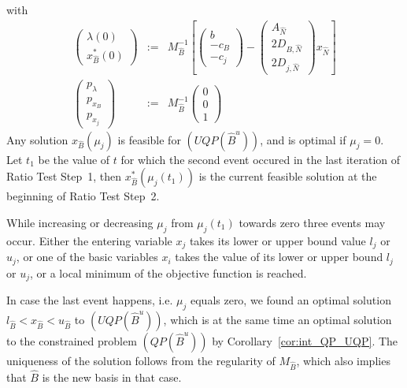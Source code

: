 \documentclass[a4paper]{article}
\begin{document}
with
\begin{eqnarray}
\left(
\begin{array}{c}
\lambda(0) \\
\hline
x_{\hat{B}}^{*}(0)
\end{array}
\right)
&:=&
M_{\hat{B}}^{-1}
\left[
\left(
\begin{array}{c}
b \\
\hline
-c_{B} \\
\hline
-c_{j}
\end{array}
\right)
-
\left(
\begin{array}{c}
A_{\hat{N}} \\
\hline
2D_{B, \hat{N}} \\
\hline
2D_{j, \hat{N}}
\end{array}
\right)
x_{\hat{N}}
\right]
\\
\left(
\begin{array}{c}
p_{\lambda} \\
\hline
p_{x_{B}} \\
\hline
p_{x_{j}}
\end{array}
\right)
&:=&
M_{\hat{B}}^{-1}
\left(
\begin{array}{c}
0 \\
\hline
0 \\
\hline
1
\end{array}
\right)
\end{eqnarray}
Any solution $x_{\hat{B}}(\mu_{j})$ is feasible for $(UQP(\hat{B}^{u}))$, and is
optimal if $\mu_{j}=0$. Let $t_{1}$ be the value of $t$ for which the second
event occured in the last iteration of Ratio Test Step~1, then
$x_{\hat{B}}^{*}(\mu_{j}(t_{1}))$ is the current feasible solution at the
beginning of Ratio Test Step~2.

While increasing or decreasing $\mu_{j}$ from $\mu_{j}(t_{1})$ towards zero
three events may occur. Either the entering variable $x_{j}$ takes its lower or
upper bound value $l_{j}$ or $u_{j}$, or one of the basic variables $x_{i}$
takes the value of its lower or upper bound $l_{j}$ or $u_{j}$, or a local
minimum of the objective function is reached.

In case the last event happens, i.e. $\mu_{j}$ equals zero, we found an optimal
solution $l_{\hat{B}} < x_{\hat{B}} < u_{\hat{B}}$ to $(UQP(\hat{B}^{u}))$,
which is at the same time an optimal solution to the constrained problem
$(QP(\hat{B}^{u}))$ by Corollary~\ref{cor:int_QP_UQP}. The uniqueness of the
solution follows from the regularity of $M_{\hat{B}}$, which also implies that
$\hat{B}$ is the new basis in that case.
\end{document}
